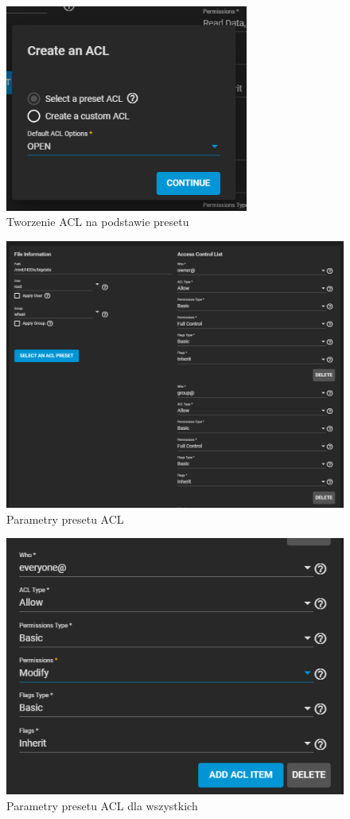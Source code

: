 \documentclass[12pt,a4paper]{article}
\newcommand{\<}{\langle}
\renewcommand{\>}{\rangle}
\theoremstyle{definition}
\begin{document}
\begin{figure}[H]
    \centering
    \includegraphics[width=8cm]{img/ss_truenas/41.png}
    \caption{Tworzenie ACL na podstawie presetu}
\end{figure}
\begin{figure}[H]
    \centering
    \includegraphics[width=15cm]{img/ss_truenas/42.png}
    \caption{Parametry presetu ACL}
\end{figure}
\begin{figure}[H]
    \centering
    \includegraphics[width=\linewidth]{img/ss_truenas/43.png}
    \caption{Parametry presetu ACL dla wszystkich}
\end{figure}
\end{document}
